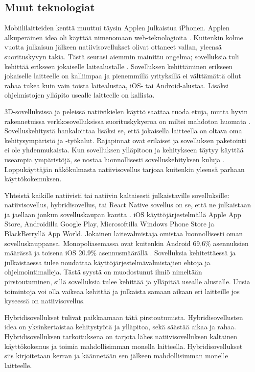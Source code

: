 \documentclass{tktltiki}
\begin{document}
\subsection{Muut teknologiat}

Mobiililaitteiden kenttä muuttui täysin Applen julkaistua iPhonen. Applen alkuperäinen idea oli käyttää nimenomaan web-teknologioita \cite{charland2011mobile}. Kuitenkin kolme vuotta julkaisun jälkeen natiivisovellukset olivat ottaneet vallan, yleensä suorituskyvyn takia. Tästä seurasi aiemmin mainittu ongelma; sovelluksia tuli kehittää erikseen jokaiselle laitealustalle \cite{charland2011mobile}. Sovelluksen kehittäminen erikseen jokaiselle laitteelle on kalliimpaa ja pienemmillä yrityksillä ei välttämättä ollut rahaa tukea kuin vain toista laitealustaa, iOS- tai Android-alustaa. Lisäksi ohjelmistojen ylläpito usealle laitteelle on kallista.

3D-sovelluksissa ja peleissä natiivikielen käyttö saattaa tuoda etuja, mutta hyvin rakennetuissa verkkosovelluksissa suorituskykyeroa on miltei mahdoton huomata \cite{charland2011mobile}. Sovelluskehitystä hankaloittaa lisäksi se, että jokaisella laitteella on oltava oma kehitysympäristö ja -työkalut. Rajapinnat ovat erilaiset ja sovelluksen paketointi ei ole yhdenmukaista. Kun sovelluksen ylläpitoon ja kehitykseen täytyy käyttää useampia ympäristöjä, se nostaa luonnollisesti sovelluskehityksen kuluja \cite{xanthopoulos2013comparative}. Loppukäyttäjän näkökulmasta natiivisovellus tarjoaa kuitenkin yleensä parhaan käyttökokemuksen.

Yhteistä kaikille natiivisti tai natiivin kaltaisesti julkaistaville sovelluksille: natiivisovellus, hybridisovellus, tai React Native sovellus on se, että ne julkaistaan ja jaellaan jonkun sovelluskaupan kautta \cite{xanthopoulos2013comparative}. iOS käyttöjärjestelmällä Apple App Store, Androidilla Google Play, Microsoftilla Windows Phone Store ja BlackBerryllä App World. Jokainen laitevalmistaja omistaa luonnollisesti oman sovelluskauppansa. Monopoliasemassa ovat kuitenkin Android 69,6\% asennuksien määrässä ja toisena iOS 20.9\% asennusmäärällä \cite{xanthopoulos2013comparative}. Sovelluksia kehitettäessä ja julkaistaessa tulee noudattaa käyttöjärjestelmävalmistajien ehtoja ja ohjelmointimalleja. Tästä syystä on muodostunut ilmiö nimeltään pirstoutuminen, sillä sovelluksia tulee kehittää ja ylläpitää usealle alustalle. Uusia toimintoja voi olla vaikeaa kehittää ja julkaista samaan aikaan eri laitteille jos kyseessä on natiivisovellus.

Hybridisovellukset tulivat paikkaamaan tätä pirstoutumista. Hybridisovellusten idea on yksinkertaistaa kehitystyötä ja ylläpitoa, sekä säästää aikaa ja rahaa.  Hybridisovelluksen tarkoituksena on tarjota lähes natiivisovelluksen kaltainen käyttökokemus ja toimia mahdollisimman monella laitteella. Hybridisovellukset siis kirjoitetaan kerran ja käännetään sen jälkeen mahdollisimman monelle laitteelle. 
\end{document}
